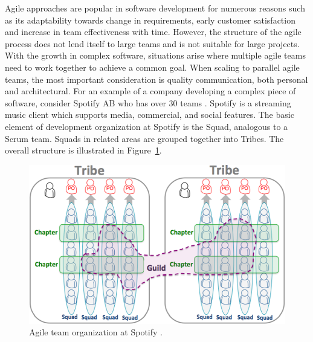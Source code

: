 
Agile approaches are popular in software development for numerous reasons such as its adaptability towards change in requirements, early customer satisfaction and increase in team effectiveness with time.
However, the structure of the agile process does not lend itself to large teams and is not suitable for large projects.
With the growth in complex software, situations arise where multiple agile teams need to work together to achieve a common goal.
When scaling to parallel agile teams, the most important consideration is quality communication, both personal and architectural.
%
For an example of a company developing a complex piece of software, consider Spotify AB who has over 30 teams \cite{kniberg12}.
Spotify is a streaming music client which supports media, commercial, and social features.
The basic element of development organization at Spotify is the Squad, analogous to a Scrum team.
Squads in related areas are grouped together into Tribes. 
The overall structure is illustrated in Figure~\ref{fig:spotify_structure}.
\begin{figure}[h]
  \includegraphics[width=\linewidth]{images/kniberg12_structure.png}
  \caption{Agile team organization at Spotify \cite{kniberg12}.}
  \label{fig:spotify_structure}
\end{figure}


